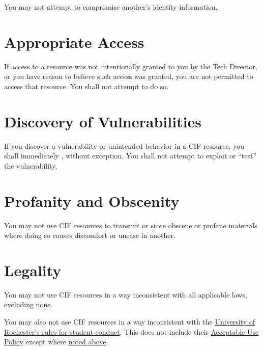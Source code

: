 \documentclass[12pt]{article}
\newcommand{\rochesterAUP}[1]{\href{http://www.resnet.rochester.edu/getstarted/aup.php}{#1}}
\begin{document}
You may not attempt to compromise another's identity information.


\section{Appropriate Access} %

If access to a resource was not intentionally granted to you by the Tech Director, or you have reason to believe such access was granted, you are not permitted to access that resource. You shall not attempt to do so.


\section{Discovery of Vulnerabilities} %

If you discover a vulnerability or unintended behavior in a CIF resource, you shall immediately , without exception. You shall not attempt to exploit or ``test'' the vulnerability.


\section{Profanity and Obscenity} %

You may not use CIF resources to transmit or store obscene or profane materials where doing so causes discomfort or unease in another.


\section{Legality} %

You may not use CIF resources in a way inconsistent with all applicable laws, excluding none.

You may also not use CIF resources in a way inconsistent with the \href{http://www.rochester.edu/college/odos/conduct/}{University of Rochester's rules for student conduct}. This does not include their \rochesterAUP{Acceptable Use Policy} except where \hyperref[sec:rochester-aup]{noted above}.

\end{document}

